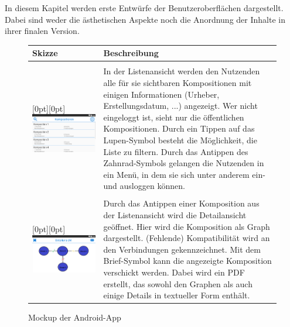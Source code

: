 In diesem Kapitel werden erste Entwürfe der Benutzeroberflächen dargestellt. Dabei sind weder die ästhetischen Aspekte noch die Anordnung der Inhalte in ihrer finalen Version.

\begin{figure}[h]
	\centering

	\begin{tabularx}{\textwidth}{ p{} | X }
		\textbf{Skizze} & \textbf{Beschreibung}

		\\ \hline \\

		\raisebox{-.9\height}[0pt][0pt]{\includegraphics[width=.5\textwidth]{img/mockup_list}}
		\label{fig:mock-list}

		&In der Listenansicht werden den Nutzenden alle für sie sichtbaren Kompositionen mit einigen Informationen (Urheber, Erstellungsdatum, ...) angezeigt. Wer nicht eingeloggt ist, sieht nur die öffentlichen Kompositionen. Durch ein Tippen auf das Lupen-Symbol besteht die Möglichkeit, die Liste zu filtern. Durch das Antippen des Zahnrad-Symbols gelangen die Nutzenden in ein Menü, in dem sie sich unter anderem ein- und ausloggen können.

		\\ \hline \\
		\raisebox{-.9\height}[0pt][0pt]{\includegraphics[width=.5\textwidth]{img/mockup_detail}}
		\label{fig:mock-detail}

		&
		Durch das Antippen einer Komposition aus der Listenansicht wird die Detailansicht geöffnet. Hier wird die Komposition als Graph dargestellt. (Fehlende) Kompatibilität wird an den Verbindungen gekennzeichnet. Mit dem Brief-Symbol kann die angezeigte Komposition verschickt werden.  Dabei wird ein PDF erstellt, das sowohl den Graphen als auch einige Details in textueller Form enthält.

	\end{tabularx}

	\caption{Mockup der Android-App}
	\label{fig:app-mockup}
\end{figure}


